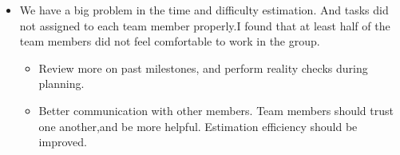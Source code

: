 \begin{itemize}
   \item We have a big problem in the time and difficulty estimation. And tasks did not assigned to  each team        member properly.I found that at least half of the  team members did not feel comfortable to work in the       group. 
      \begin{itemize}
         \item Review more on past milestones, and perform reality checks during planning.
      \end{itemize}

     \begin{itemize}
        \item  Better communication with other members.
          Team members should trust one another,and be more helpful.
          Estimation efficiency should be improved.       
     \end{itemize}
\end{itemize}
